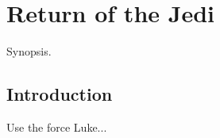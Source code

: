 
\chapter{Return of the Jedi}
	\label{chapter:return-of-the-jedi}%



\begin{synopsis}
	Synopsis.
\end{synopsis}


\section{Introduction}

Use the force Luke...


